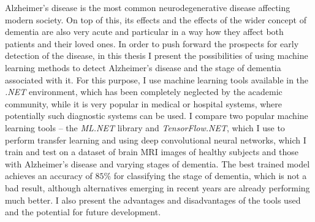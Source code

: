 \begin{abstract-en}

  Alzheimer's disease is the most common neurodegenerative disease affecting modern society.
  On top of this, its effects and the effects of the wider concept of dementia are also very acute and particular in a way how they affect both patients and their loved ones.
  In order to push forward the prospects for early detection of the disease, in this thesis I present the possibilities of using machine learning methods to detect Alzheimer's disease and the stage of dementia associated with it.
  For this purpose, I use machine learning tools available in the \emph{.NET} environment, which has been completely neglected by the academic community, while it is very popular in medical or hospital systems, where potentially such diagnostic systems can be used.
  I compare two popular machine learning tools -- the \emph{ML.NET} library and \emph{TensorFlow.NET}, which I use to perform transfer learning and using deep convolutional neural networks, which I train and test on a dataset of brain MRI images of healthy subjects and those with Alzheimer's disease and varying stages of dementia.
  The best trained model achieves an accuracy of $85\%$ for classifying the stage of dementia, which is not a bad result, although alternatives emerging in recent years are already performing much better.
  I also present the advantages and disadvantages of the tools used and the potential for future development.

\end{abstract-en}
